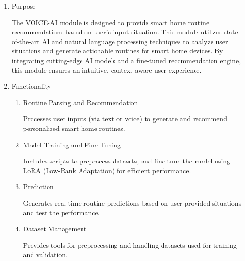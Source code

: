 \documentclass[conference]{IEEEtran}
\begin{document}
\begin{enumerate}[label=\arabic*]
    \item Purpose\par
    \vspace{0.3em}
    The VOICE-AI module is designed to provide smart home routine recommendations based on user’s input situation. This module utilizes state-of-the-art AI and natural language processing techniques to analyze user situations and generate actionable routines for smart home devices. By integrating cutting-edge AI models and a fine-tuned recommendation engine, this module ensures an intuitive, context-aware user experience.
    
    \vspace{1em}

    \item Functionality\par
    \vspace{0.3em}

    \begin{enumerate}[label=\arabic*)]   
        \item Routine Parsing and Recommendation\par
        \vspace{0.3em}
        Processes user inputs (via text or voice) to generate and recommend personalized smart home routines.

        \vspace{1em}

        \item Model Training and Fine-Tuning\par
        \vspace{0.3em}
        Includes scripts to preprocess datasets, and fine-tune the model using LoRA (Low-Rank Adaptation) for efficient performance.

        \vspace{1em}

        \item Prediction\par
        \vspace{0.3em}
        Generates real-time routine predictions based on user-provided situations and test the performance.

        \vspace{1em}

        \item Dataset Management\par
        \vspace{0.3em}
        Provides tools for preprocessing and handling datasets used for training and validation.


\end{enumerate}
\end{enumerate}
\end{document}
